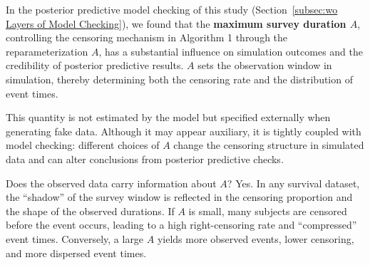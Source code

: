 In the posterior predictive model checking of this study (Section~\ref{subsec:wo Layers of Model Checking}), we found that the \textbf{maximum survey duration $A$}, controlling the censoring mechanism in Algorithm 1 through the reparameterization $A$, has a substantial influence on simulation outcomes and the credibility of posterior predictive results. $A$ sets the observation window in simulation, thereby determining both the censoring rate and the distribution of event times.

This quantity is not estimated by the model but specified externally when generating fake data. Although it may appear auxiliary, it is tightly coupled with model checking: different choices of $A$ change the censoring structure in simulated data and can alter conclusions from posterior predictive checks.

Does the observed data carry information about $A$? Yes. In any survival dataset, the “shadow” of the survey window is reflected in the censoring proportion and the shape of the observed durations. If $A$ is small, many subjects are censored before the event occurs, leading to a high right-censoring rate and “compressed” event times. Conversely, a large $A$ yields more observed events, lower censoring, and more dispersed event times.

